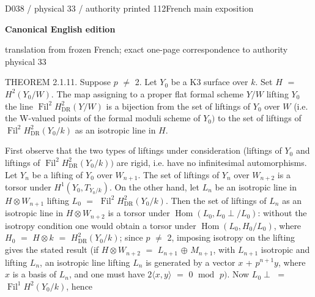 \documentclass[9pt]{article}
\newcommand{\CanonText}[1]{\par{\fontsize{8.0}{9.35}\selectfont\RaggedRight #1\par}\vspace{2.2pt}}
\newcommand{\LayerTitle}{Canonical English edition}
\begin{document}
\noindent\begin{minipage}[t][\dimexpr\textheight-5pt\relax][t]{\textwidth}
{\sffamily\fontsize{7.3}{8.2}\selectfont\color{Quiet} D038 / physical 33 / authority printed 112\hfill French main exposition}
\par{}\vspace{4.5pt}
{\sffamily\fontsize{10.4}{11.6}\selectfont\bfseries\color{Accent} \LayerTitle}
\par{\sffamily\fontsize{6.7}{7.7}\selectfont\color{Quiet} translation from frozen French; exact one-page correspondence to authority physical 33}
\vspace{5pt}
\CanonText{THEOREM 2.1.11. Suppose \(p\) \(\neq{}\) 2. Let \(Y_{0}\) be a K3 surface over \(k\). Set \(H\) \(=\) \(H^{2}(Y_{0}/W)\). The map assigning to a proper flat formal scheme \(Y/W\) lifting \(Y_{0}\) the line \(\operatorname{Fil}^{2}H^{2}_{\mathrm{DR}}(Y/W)\) is a bijection from the set of liftings of \(Y_{0}\) over \(W\) (i.e. the W-valued points of the formal moduli scheme of \(Y_{0})\) to the set of liftings of \(\operatorname{Fil}^{2}H^{2}_{\mathrm{DR}}(Y_{0}/k)\) as an isotropic line in \(H\).}
\CanonText{First observe that the two types of liftings under consideration (liftings of \(Y_{0}\) and liftings of \(\operatorname{Fil}^{2}H^{2}_{\mathrm{DR}}(Y_{0}/k))\) are rigid, i.e. have no infinitesimal automorphisms. Let \(Y_{n}\) be a lifting of \(Y_{0}\) over \(W_{n+1}\). The set of liftings of \(Y_{n}\) over \(W_{n+2}\) is a torsor under \(H^{1}(Y_{0},T_{Y_{0}/k})\). On the other hand, let \(L_{n}\) be an isotropic line in \(H\otimes{}W_{n+1}\) lifting \(L_{0}\) \(=\) \(\operatorname{Fil}^{2}H^{2}_{\mathrm{DR}}(Y_{0}/k)\). Then the set of liftings of \(L_{n}\) as an isotropic line in \(H\otimes{}W_{n+2}\) is a torsor under \(\operatorname{Hom}(L_{0},L_{0}\perp{}/L_{0})\): without the isotropy condition one would obtain a torsor under \(\operatorname{Hom}(L_{0},H_{0}/L_{0})\), where \(H_{0}\) \(=\) \(H\otimes{}k\) \(=\) \(H^{2}_{\mathrm{DR}}(Y_{0}/k)\); since \(p\) \(\neq{}\) 2, imposing isotropy on the lifting gives the stated result (if \(H\otimes{}W_{n+2}\) \(=\) \(L_{n+1}\) \(\oplus{}\) \(M_{n+1}\), with \(L_{n+1}\) isotropic and lifting \(L_{n}\), an isotropic line lifting \(L_{n}\) is generated by a vector \(x\) + \(p^{n+1}y\), where \(x\) is a basis of \(L_{n}\), and one must have \(2\langle{}x,y\rangle{}\) \(=\) 0 \(\operatorname{mod}\) \(p)\). Now \(L_{0}\perp{}\) \(=\) \(\operatorname{Fil}^{1}H^{2}(Y_{0}/k)\), hence}

\end{minipage}
\end{document}
